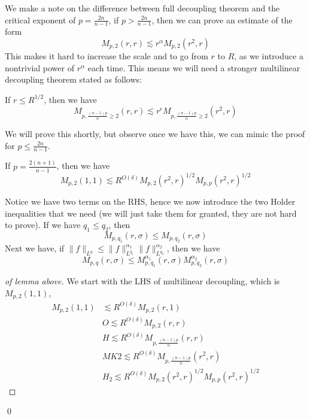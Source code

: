 We make a note on the difference between full decoupling theorem and the critical exponent of $p=\frac{2n}{n-1}$, if $p>\frac{2n}{n-1}$, then we can prove an estimate of the form
\begin{equation*}
    M_{p,2}(r,r)\lesssim r^\alpha M_{p,2}(r^2,r)
\end{equation*}
This makes it hard to increase the scale and to go from $r$ to $R$, as we introduce a nontrivial power of $r^\alpha$ each time. This means we will need a stronger multilinear decoupling theorem stated as follows:
\begin{theorem}[MK2]
    If $r\leq R^{1/2}$, then we have
    \begin{equation*}
        M_{p,\frac{(n-1)p}{n}\geq 2}(r,r)\lesssim r^\epsilon M_{p,\frac{(n-1)p}{n}\geq 2}(r^2,r)
    \end{equation*}
\end{theorem}
We will prove this shortly, but observe once we have this, we can mimic the proof for $p\leq\frac{2n}{n-1}$.
\begin{lemma}
    If $p=\frac{2(n+1)}{n-1}$, then we have
    \begin{equation*}
        M_{p,2}(1,1)\lesssim R^{O(\delta)}M_{p,2}(r^2,r)^{1/2}M_{p,p}(r^2,r)^{1/2}
    \end{equation*}
\end{lemma}
Notice we have two terms on the RHS, hence we now introduce the two Holder inequalities that we need (we will just take them for granted, they are not hard to prove).
If we have $q_1\leq q_2$, then
\begin{equation*}
    M_{p,q_1}(r,\sigma)\leq M_{p,q_2}(r,\sigma)
\end{equation*}
Next we have, if $\|f\|_{L^q}\leq\|f\|_{L^{q_1}}^{\alpha_1}\|f\|_{L^{q_2}}^{\alpha_2}$, then we have
\begin{equation*}
    M_{p,q}(r,\sigma)\leq M_{p,q_1}^{\alpha_1}(r, \sigma)M_{p,q_2}^{\alpha_2}(r,\sigma)
\end{equation*}
\begin{proof}[of lemma above]
    We start with the LHS of multilinear decoupling, which is $M_{p,2}(1,1)$,
    \begin{align*}
        M_{p,2}(1,1)&\lesssim R^{O(\delta)}M_{p,2}(r,1)\\
        & O \lesssim R^{O(\delta)}M_{p,2}(r,r)\\
        & H \lesssim R^{O(\delta)}M_{p,\frac{(n-1)p}{n}}(r,r)\\
        & MK2 \lesssim R^{O(\delta)}M_{p,\frac{(n-1)p}{n}}(r^2,r)\\
        & H_2 \lesssim R^{O(\delta)} M_{p,2}(r^2,r)^{1/2}M_{p,p}(r^2,r)^{1/2}
    \end{align*}
\end{proof}
\qed

